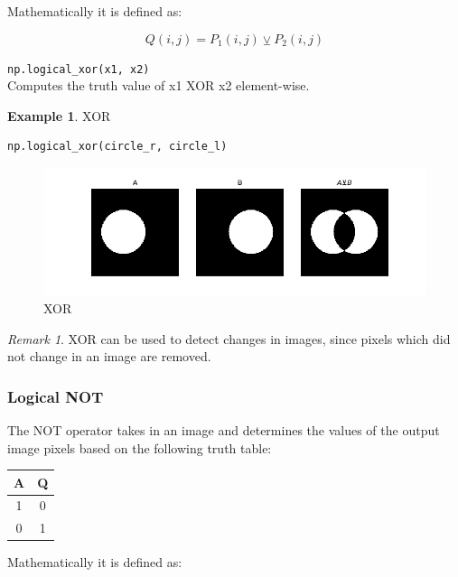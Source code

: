 \documentclass{article}
\theoremstyle{definition}
\newtheorem{ex}{Example}[subsection]
\theoremstyle{remark}
\newtheorem*{rem}{Remark}
\newcommand{\func}[2]{\noindent\lstinline{#1}\\#2}
\begin{document}
\noindent Mathematically it is defined as:

\begin{equation}
    Q(i,j) = P_1(i, j) \veebar P_2(i, j) 
\end{equation}

\func{np.logical_xor(x1, x2)}{Computes the truth value of x1 XOR x2 element-wise.}

\begin{ex}XOR
\begin{lstlisting}[language=Python]
np.logical_xor(circle_r, circle_l)
\end{lstlisting}
\begin{figure}[H]
    \centering
    \includegraphics[width=\textwidth]{ocv_XOR}
    \caption{XOR}
    \label{fig:ocv_xor}
\end{figure}
\end{ex}

\begin{rem}
XOR can be used to detect changes in images, since pixels which did not change in an image are removed.
\end{rem}

\subsubsection{Logical NOT}

The NOT operator takes in an image and determines the values of the output image pixels based on the following truth table:

\begin{table}[H]
    \centering
    \def\arraystretch{1.1}%
    \begin{tabular}{ c c } 
	\hline
	A & Q \\
	\hline
	1 & 0 \\
	0 & 1 \\
	\hline
    \end{tabular}
\end{table}

\noindent Mathematically it is defined as:
\end{document}
